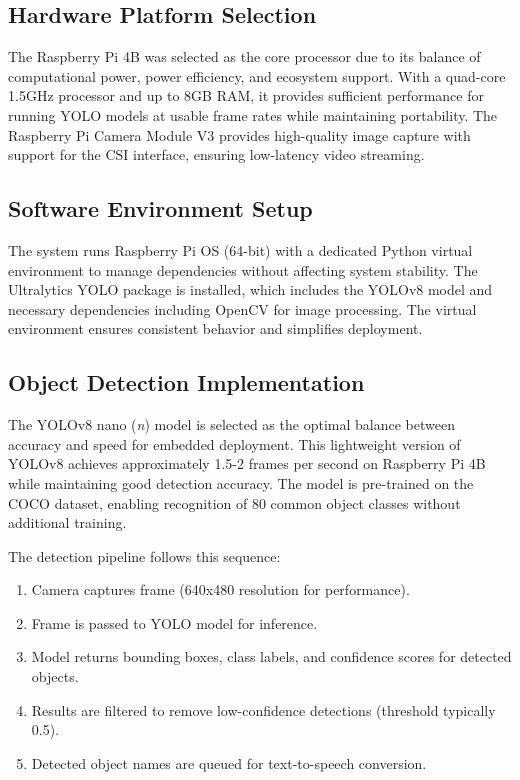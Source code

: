 \documentclass[conference]{IEEEtran}
\begin{document}
\subsection{Hardware Platform Selection}
The Raspberry Pi 4B was selected as the core processor due to its balance of computational power, power efficiency, and ecosystem support. With a quad-core 1.5GHz processor and up to 8GB RAM, it provides sufficient performance for running YOLO models at usable frame rates while maintaining portability. The Raspberry Pi Camera Module V3 provides high-quality image capture with support for the CSI interface, ensuring low-latency video streaming.

\subsection{Software Environment Setup}
The system runs Raspberry Pi OS (64-bit) with a dedicated Python virtual environment to manage dependencies without affecting system stability. The Ultralytics YOLO package is installed, which includes the YOLOv8 model and necessary dependencies including OpenCV for image processing. The virtual environment ensures consistent behavior and simplifies deployment.

\subsection{Object Detection Implementation}
The YOLOv8 nano (\textit{n}) model is selected as the optimal balance between accuracy and speed for embedded deployment. This lightweight version of YOLOv8 achieves approximately 1.5-2 frames per second on Raspberry Pi 4B while maintaining good detection accuracy. The model is pre-trained on the COCO dataset, enabling recognition of 80 common object classes without additional training.

The detection pipeline follows this sequence:
\begin{enumerate}
    \item Camera captures frame (640x480 resolution for performance).
    \item Frame is passed to YOLO model for inference.
    \item Model returns bounding boxes, class labels, and confidence scores for detected objects.
    \item Results are filtered to remove low-confidence detections (threshold typically 0.5).
    \item Detected object names are queued for text-to-speech conversion.
\end{enumerate}
\end{document}
